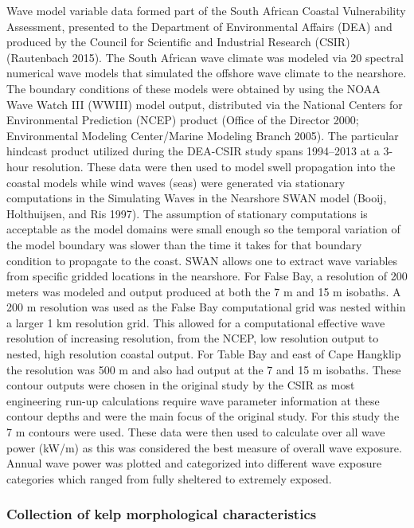 \documentclass[
  a4paper,
]{article}
\begin{document}
Wave model variable data formed part of the South African Coastal
Vulnerability Assessment, presented to the Department of Environmental
Affairs (DEA) and produced by the Council for Scientific and Industrial
Research (CSIR) (Rautenbach 2015). The South African wave climate was
modeled via 20 spectral numerical wave models that simulated the
offshore wave climate to the nearshore. The boundary conditions of these
models were obtained by using the NOAA Wave Watch III (WWIII) model
output, distributed via the National Centers for Environmental
Prediction (NCEP) product (Office of the Director 2000; Environmental
Modeling Center/Marine Modeling Branch 2005). The particular hindcast
product utilized during the DEA-CSIR study spans 1994--2013 at a 3-hour
resolution. These data were then used to model swell propagation into
the coastal models while wind waves (seas) were generated via stationary
computations in the Simulating Waves in the Nearshore SWAN model (Booij,
Holthuijsen, and Ris 1997). The assumption of stationary computations is
acceptable as the model domains were small enough so the temporal
variation of the model boundary was slower than the time it takes for
that boundary condition to propagate to the coast. SWAN allows one to
extract wave variables from specific gridded locations in the nearshore.
For False Bay, a resolution of 200 meters was modeled and output
produced at both the 7 m and 15 m isobaths. A 200 m resolution was used
as the False Bay computational grid was nested within a larger 1 km
resolution grid. This allowed for a computational effective wave
resolution of increasing resolution, from the NCEP, low resolution
output to nested, high resolution coastal output. For Table Bay and east
of Cape Hangklip the resolution was 500 m and also had output at the 7
and 15 m isobaths. These contour outputs were chosen in the original
study by the CSIR as most engineering run-up calculations require wave
parameter information at these contour depths and were the main focus of
the original study. For this study the 7 m contours were used. These
data were then used to calculate over all wave power (kW/m) as this was
considered the best measure of overall wave exposure. Annual wave power
was plotted and categorized into different wave exposure categories
which ranged from fully sheltered to extremely exposed.

\hypertarget{collection-of-kelp-morphological-characteristics}{%
\subsubsection{Collection of kelp morphological
characteristics}\label{collection-of-kelp-morphological-characteristics}}
\end{document}
